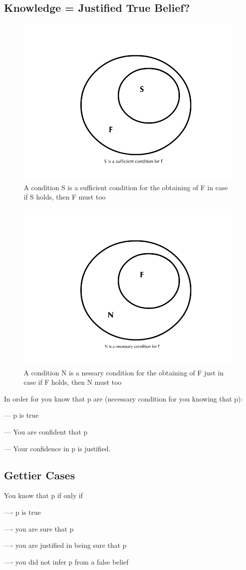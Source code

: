 \documentclass{article}
\begin{document}
\subsection{Knowledge = Justified True Belief?}

\begin{figure}[h]
\centering
\includegraphics[width=0.7\linewidth, height=0.4\textheight]{figures/SufficientCondition}
\caption{A condition S is a sufficient condition for the obtaining of F in case if S holds, then F must too}
\label{fig:sufficientcondition}
\end{figure}

\begin{figure}[h]
\centering
\includegraphics[width=0.7\linewidth, height=0.4\textheight]{figures/NecessaryCondition}
\caption{A condition N is a nessary condition for the obtaining of F just in case if F holds, then N must too}
\label{fig:necessarycondition}
\end{figure}


In order for you know that p are (necessary condition for you knowing that p):

--- p is true

--- You are confident that p

--- Your confidence in p is justified.

\subsection{Gettier Cases}
 You know that p if only if
 
 ---- p is true
 
 ---- you are sure that p
 
 ---- you are justified in being sure that p
 
 ---- you did not infer p from a false belief
 
 
\end{document}
